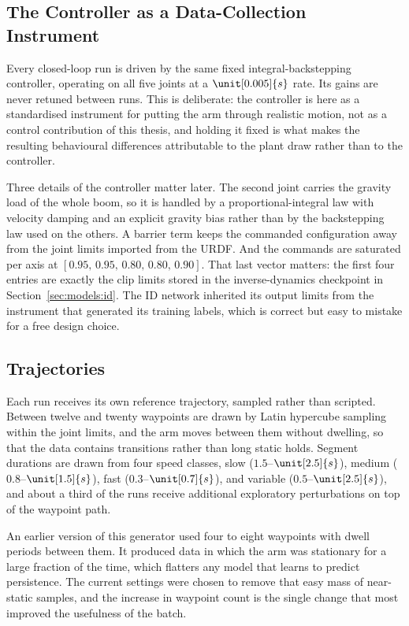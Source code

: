 \subsection{The Controller as a Data-Collection Instrument}

Every closed-loop run is driven by the same fixed integral-backstepping
controller, operating on all five joints at a $\unit[0.005]{s}$ rate.
Its gains are never retuned between runs. This is deliberate: the
controller is here as a standardised instrument for putting the arm
through realistic motion, not as a control contribution of this thesis,
and holding it fixed is what makes the resulting behavioural differences
attributable to the plant draw rather than to the controller.

Three details of the controller matter later. The second joint carries
the gravity load of the whole boom, so it is handled by a
proportional-integral law with velocity damping and an explicit gravity
bias rather than by the backstepping law used on the others. A barrier
term keeps the commanded configuration away from the joint limits
imported from the URDF. And the commands are saturated per axis at
$[0.95,\, 0.95,\, 0.80,\, 0.80,\, 0.90]$. That last vector matters: the first four entries are exactly the clip limits stored in the
inverse-dynamics checkpoint in Section~\ref{sec:models:id}. The ID
network inherited its output limits from the instrument that generated
its training labels, which is correct but easy to mistake for a
free design choice.

\subsection{Trajectories}

Each run receives its own reference trajectory, sampled rather than
scripted. Between twelve and twenty waypoints are drawn by Latin
hypercube sampling within the joint limits, and the arm moves between
them without dwelling, so that the data contains transitions rather than
long static holds. Segment durations are drawn from four speed classes,
slow ($1.5$--$\unit[2.5]{s}$), medium ($0.8$--$\unit[1.5]{s}$), fast
($0.3$--$\unit[0.7]{s}$), and variable ($0.5$--$\unit[2.5]{s}$), and
about a third of the runs receive additional exploratory perturbations
on top of the waypoint path.

An earlier version of this generator used four to eight waypoints with
dwell periods between them. It produced data in which the arm was
stationary for a large fraction of the time, which flatters any model
that learns to predict persistence. The current settings were chosen to
remove that easy mass of near-static samples, and the increase in
waypoint count is the single change that most improved the usefulness of
the batch.

